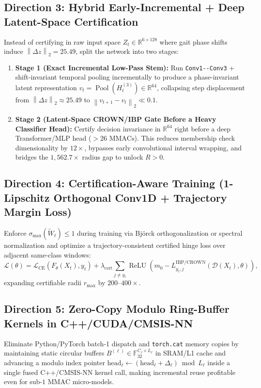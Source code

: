 \documentclass[11pt,a4paper]{article}
\newcommand{\R}{\mathbb{R}}
\newcommand{\F}{\mathbb{F}}
\newcommand{\norm}[1]{\left\lVert #1\right\rVert}
\newcommand{\code}[1]{{\small\ttfamily\nolinkurl{#1}}}
\newcommand{\relu}{\operatorname{ReLU}}
\newcommand{\Dset}{\mathcal{D}}
\begin{document}
\subsection{Direction 3: Hybrid Early-Incremental + Deep Latent-Space Certification}
Instead of certifying in raw input space $Z_t \in \R^{6 \times 128}$ where gait phase shifts induce $\norm{\Delta z}_2 = 25.49$, split the network into two stages:
\begin{enumerate}
  \item \textbf{Stage 1 (Exact Incremental Low-Pass Stem):} Run \code{Conv1--Conv3} + shift-invariant temporal pooling incrementally to produce a phase-invariant latent representation $v_t = \operatorname{Pool}(H^{(3)}_t) \in \R^{64}$, collapsing step displacement from $\norm{\Delta z}_2 \approx 25.49$ to $\norm{v_{t+1} - v_t}_2 \ll 0.1$.
  \item \textbf{Stage 2 (Latent-Space CROWN/IBP Gate Before a Heavy Classifier Head):} Certify decision invariance in $\R^{64}$ right before a deep Transformer/MLP head ($>26\text{ MMACs}$). This reduces membership check dimensionality by $12\times$, bypasses early convolutional interval wrapping, and bridges the $1,562.7\times$ radius gap to unlock $R > 0$.
\end{enumerate}

\subsection{Direction 4: Certification-Aware Training (1-Lipschitz Orthogonal Conv1D + Trajectory Margin Loss)}
Enforce $\sigma_{\max}(\widetilde{W}_\ell) \le 1$ during training via Björck orthogonalization or spectral normalization and optimize a trajectory-consistent certified hinge loss over adjacent same-class windows:
\begin{equation}
  \mathcal{L}(\theta) = \mathcal{L}_{\text{CE}}\!\left(F_\theta(X_t), y_t\right) + \lambda_{\text{cert}} \sum_{j \neq y_t} \relu\!\left(m_0 - L_{y_t, j}^{\text{IBP/CROWN}}\!\left(\Dset(X_t), \theta\right)\right),
\end{equation}
expanding certifiable radii $r_{\max}$ by $200\text{--}400\times$.

\subsection{Direction 5: Zero-Copy Modulo Ring-Buffer Kernels in C++/CUDA/CMSIS-NN}
Eliminate Python/PyTorch batch-1 dispatch and \code{torch.cat} memory copies by maintaining static circular buffers $B^{(\ell)} \in \F_{32}^{C_\ell \times L_\ell}$ in SRAM/L1 cache and advancing a modulo index pointer $\text{head}_\ell \leftarrow (\text{head}_\ell + \Delta_\ell) \bmod L_\ell$ inside a single fused C++/CMSIS-NN kernel call, making incremental reuse profitable even for sub-$1\text{ MMAC}$ micro-models.
\end{document}

